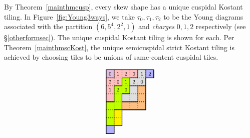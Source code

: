 \documentclass[Unicode,ALCO]{cedram}
\newcommand{\0}{{\bar 0}}
\newcommand{\hackcenter}[1]{
 \xy (0,0)*{#1}; \endxy}
\begin{document}
\begin{exam}
By Theorem~\ref{mainthmcusp}, every skew shape has a unique cuspidal Kostant tiling. In Figure~\ref{fig:Young3ways}, we take \(\tau_0, \tau_1, \tau_2\) to be the Young diagrams associated with the partition \((6,5^4,2^2,1)\) and {\em charges} \(0,1,2\) respectively (see \S\ref{otherformsec}).
The unique cuspidal Kostant tiling is shown for each. Per Theorem~\ref{mainthmscKost}, the unique semicuspidal strict Kostant tiling is achieved by choosing tiles to be unions of same-content cuspidal tiles.

\begin{figure}
\begin{align*}
{}
\hackcenter{
\begin{tikzpicture}[scale=0.4]
\draw[thick, fill=lightgray!50]  (0,0)--(1,0)--(1,1)--(2,1)--(2,3)--(5,3)--(5,7)--(6,7)--(6,8)--(0,8)--(0,0);
\draw[thick,  fill=blue!30]  (0,0)--(1,0)--(1,1)--(0,1)--(0,0);
\draw[thick, fill=blue!30]  (5,7)--(6,7)--(6,8)--(5,8)--(5,7);
\draw[thick, fill=lime]  (0,1)--(1,1)--(1,3)--(2,3)--(2,5)--(3,5)--(3,7)--(2,7)--(2,6)--(1,6)--(1,4)--(0,4)--(0,1);
\draw[thick, fill=yellow]  (1,1)--(2,1)--(2,3)--(1,3)--(1,1);
\draw[thick, fill=pink]  (0,4)--(1,4)--(1,6)--(2,6)--(2,7)--(4,7)--(4,8)--(1,8)--(1,7)--(0,7)--(0,4);
\draw[thick, fill=violet!25] (0,7)--(1,7)--(1,8)--(0,8)--(0,7);
\draw[thick, fill=orange!50] (2,3)--(5,3)--(5,6)--(4,6)--(4,4)--(2,4)--(2,3);
\draw[thick, fill=lightgray!50] (2,4)--(4,4)--(4,6)--(3,6)--(3,5)--(2,5)--(2,4);
\draw[thick, fill=lightgray!50] (3,6)--(5,6)--(5,8)--(4,8)--(4,7)--(3,7)--(3,6);
\draw[thick]  (0,0)--(1,0)--(1,1)--(2,1)--(2,3)--(5,3)--(5,7)--(6,7)--(6,8)--(0,8)--(0,0);
\draw[thick, dotted] (0,1)--(1,1);
\draw[thick, dotted] (0,2)--(2,2);
\draw[thick, dotted] (0,3)--(2,3);
\draw[thick, dotted] (0,4)--(5,4);
\draw[thick, dotted] (0,5)--(5,5);
\draw[thick, dotted] (0,6)--(5,6);
\draw[thick, dotted] (0,7)--(5,7);
\draw[thick, dotted] (1,0)--(1,8);
\draw[thick, dotted] (2,1)--(2,8);
\draw[thick, dotted] (3,3)--(3,8);
\draw[thick, dotted] (4,3)--(4,8);
\draw[thick, dotted] (5,3)--(5,8);
\node at (0.5,7.5){$\scriptstyle 0$};
\node at (1.5,7.5){$\scriptstyle 1$};
\node at (2.5,7.5){$\scriptstyle 2$};
\node at (3.5,7.5){$\scriptstyle 0$};
\node at (4.5,7.5){$\scriptstyle 1$};
\node at (5.5,7.5){$\scriptstyle 2$};
\node at (0.5,6.5){$\scriptstyle 2$};
\node at (1.5,6.5){$\scriptstyle 0$};
\node at (2.5,6.5){$\scriptstyle 1$};
\node at (3.5,6.5){$\scriptstyle 2$};
\node at (4.5,6.5){$\scriptstyle 0$};
\node at (0.5,5.5){$\scriptstyle 1$};
\node at (1.5,5.5){$\scriptstyle 2$};
\node at (2.5,5.5){$\scriptstyle 0$};

\end{tikzpicture}}
\end{align*}
\end{figure}
\end{exam}
\end{document}

